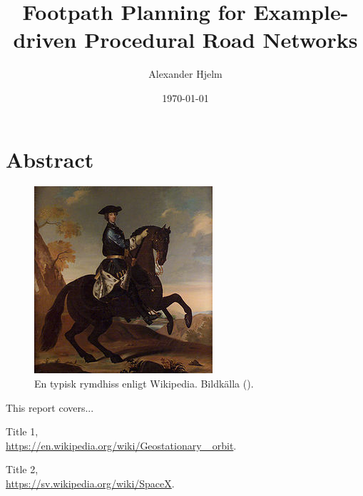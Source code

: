 \documentclass[a4paper]{article}
\title{Footpath Planning for Example-driven Procedural Road Networks}
\author{Alexander Hjelm}
\date{\today}
\begin{document}
\maketitle

\section{Abstract}

\begin{figure}[H]
\centering
\includegraphics[height=0.5\textheight]{test_image}
\caption{En typisk rymdhiss enligt Wikipedia. Bildkälla (\cite{sampleitem1}).}
\label{fig:space}
\end{figure}

This report covers... \cite{sampleitem2}

\begin{thebibliography}{9}
Title 1, \\ 
\href{https://en.wikipedia.org/wiki/Geostationary\_ orbit}{https://en.wikipedia.org/wiki/Geostationary\_ orbit}.

Title 2, \\ 
\href{https://sv.wikipedia.org/wiki/SpaceX}{https://sv.wikipedia.org/wiki/SpaceX}.

\end{thebibliography}
\end{document}
